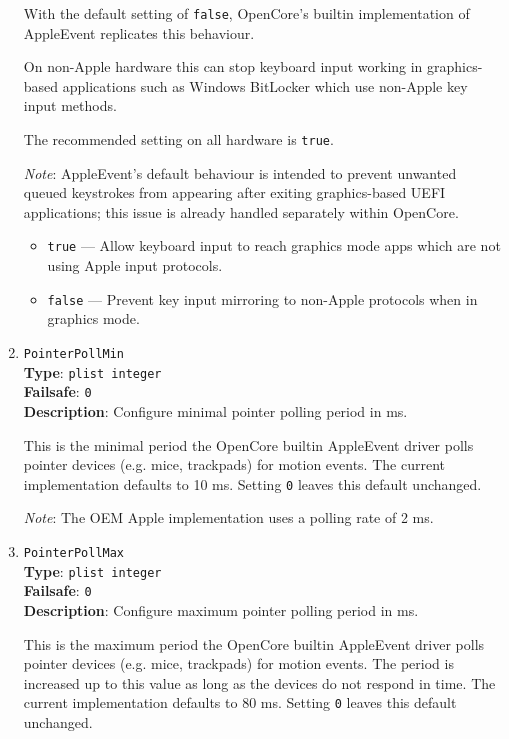\documentclass[]{article}
\providecommand{\tightlist}{%
  \setlength{\itemsep}{0pt}\setlength{\parskip}{0pt}}
\begin{document}
\begin{enumerate}
  With the default setting of \texttt{false}, OpenCore's builtin implementation of AppleEvent replicates this behaviour.

  On non-Apple hardware this can stop keyboard input working in graphics-based applications such as Windows BitLocker
  which use non-Apple key input methods.

  The recommended setting on all hardware is \texttt{true}.

  \emph{Note}: AppleEvent's default behaviour is intended to prevent unwanted queued keystrokes from appearing
  after exiting graphics-based UEFI applications; this issue is already handled separately within OpenCore.

  \begin{itemize}
  \tightlist
  \item \texttt{true} --- Allow keyboard input to reach graphics mode apps which are not using Apple input protocols.
  \item \texttt{false} --- Prevent key input mirroring to non-Apple protocols when in graphics mode.
  \end{itemize}

  \item
  \texttt{PointerPollMin}\\
  \textbf{Type}: \texttt{plist\ integer}\\
  \textbf{Failsafe}: \texttt{0}\\
  \textbf{Description}: Configure minimal pointer polling period in ms.

  This is the minimal period the OpenCore builtin AppleEvent driver polls
  pointer devices (e.g. mice, trackpads) for motion events. The current
  implementation defaults to 10 ms. Setting \texttt{0} leaves this
  default unchanged.

  \emph{Note}: The OEM Apple implementation uses a polling rate of 2 ms.

  \item
  \texttt{PointerPollMax}\\
  \textbf{Type}: \texttt{plist\ integer}\\
  \textbf{Failsafe}: \texttt{0}\\
  \textbf{Description}: Configure maximum pointer polling period in ms.

  This is the maximum period the OpenCore builtin AppleEvent driver polls
  pointer devices (e.g. mice, trackpads) for motion events. The period
  is increased up to this value as long as the devices do not respond
  in time. The current implementation defaults to 80 ms. Setting
  \texttt{0} leaves this default unchanged.


\end{enumerate}
\end{document}
